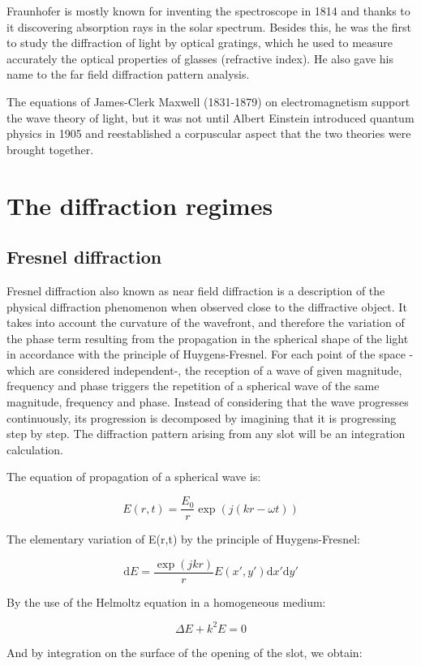 \documentclass[10pt,a4paper]{article}
\begin{document}
Fraunhofer is mostly known for inventing the spectroscope in 1814 and thanks to it discovering absorption rays in the solar spectrum. Besides this, he was the first to study the diffraction of light by optical gratings, which he used to measure accurately the optical properties of glasses (refractive index). He also gave his name to the far field diffraction pattern analysis. 

The equations of James-Clerk Maxwell (1831-1879) on electromagnetism support the wave theory of light, but it was not until Albert Einstein introduced quantum physics in 1905 and reestablished a corpuscular aspect that the two theories were brought together.

\section{The diffraction regimes}
	\subsection{Fresnel diffraction}
Fresnel diffraction also known as near field diffraction is a description of the physical diffraction phenomenon when observed close to the diffractive object. It takes into account the curvature of the wavefront, and therefore the variation of the phase term resulting from the propagation in the spherical shape of the light in accordance with the principle of Huygens-Fresnel. For each point of the space -which are considered independent-, the reception of a wave of given magnitude, frequency and phase triggers the repetition of a spherical wave of the same magnitude, frequency and phase. Instead of considering that the wave progresses continuously, its progression is decomposed by imagining that it is progressing step by step. The diffraction pattern arising from any slot will be an integration calculation. 

The equation of propagation of a spherical wave is:

\[E(r,t)= \frac{E_0}{r} \exp\left(j(kr-\omega t)\right)\]

The elementary variation of E(r,t) by the principle of Huygens-Fresnel:

\[\mathrm{d}E=\frac{\exp\left(jkr\right)}{r} E(x',y') \mathrm{d}x' \mathrm{d}y'\]

By the use of the Helmoltz equation in a homogeneous medium: 

\[\Delta E+k^2 E=0\]

And by integration on the surface of the opening of the slot, we obtain:
\end{document}

